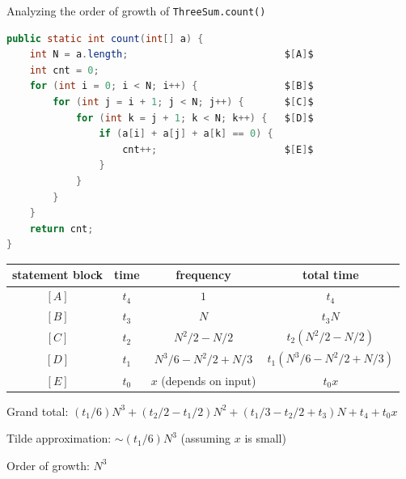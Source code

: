 \documentclass[8pt,a4paper,compress]{beamer}
\begin{document}
\begin{frame}[fragile]
\pause

Analyzing the order of growth of \lstinline{ThreeSum.count()}
\begin{lstlisting}[language=Java, mathescape]
public static int count(int[] a) {
    int N = a.length;                           $[A]$
    int cnt = 0;
    for (int i = 0; i < N; i++) {               $[B]$ 
        for (int j = i + 1; j < N; j++) {       $[C]$
            for (int k = j + 1; k < N; k++) {   $[D]$
                if (a[i] + a[j] + a[k] == 0) {
                    cnt++;                      $[E]$
                }
            }
        }
    }
    return cnt;
}
\end{lstlisting}

\pause

\begin{center}
\begin{tabular}{cccc}
statement block & time & frequency & total time\\ \hline
$[A]$ & $t_4$ & $1$  & $t_4$ \\
$[B]$ & $t_3$ & $N$  & $t_3N$ \\
$[C]$ & $t_2$ & $N^2/2-N/2$  & $t_2(N^2/2-N/2)$ \\
$[D]$ & $t_1$ & $N^3/6-N^2/2+N/3$  & $t_1(N^3/6-N^2/2+N/3)$ \\
$[E]$ & $t_0$ & $x$ (depends on input) & $t_0x$
\end{tabular} 
\end{center}

\pause

Grand total: $(t_1/6)N^3+(t_2/2-t_1/2)N^2+(t_1/3-t_2/2+t_3)N+t_4+t_0x$

\pause
\smallskip

Tilde approximation: $\sim(t_1/6)N^3$ (assuming $x$ is small)

\pause
\smallskip

Order of growth: $N^3$
\end{frame}
\end{document}
